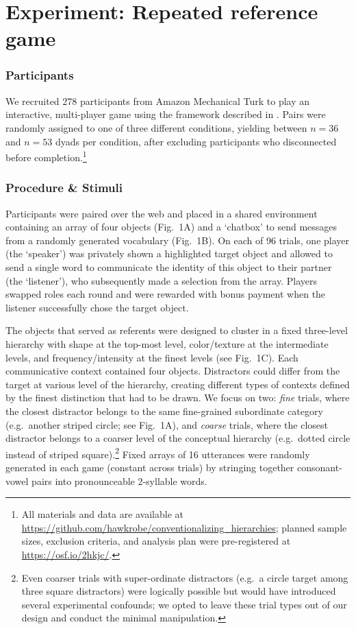 \documentclass[10pt,letterpaper]{article}
\begin{document}
\section{Experiment: Repeated reference game}

\subsubsection{Participants}

We recruited 278 participants from Amazon Mechanical Turk to play an interactive, multi-player game using the framework described in . Pairs were randomly assigned to one of three different conditions, yielding between $n=36$ and $n=53$ dyads per condition, after excluding participants who disconnected before completion.\footnote{All materials and data are available at \url{https://github.com/hawkrobe/conventionalizing_hierarchies}; planned sample sizes, exclusion criteria, and analysis plan were pre-registered at \url{https://osf.io/2hkjc/}.}

\subsubsection{Procedure \& Stimuli}
Participants were paired over the web and placed in a shared environment containing an array of four objects (Fig.\ 1A) and a `chatbox' to send messages from a randomly generated vocabulary (Fig.\ 1B). On each of 96 trials, one player (the `speaker') was privately shown a highlighted target object and allowed to send a single word to communicate the identity of this object to their partner (the `listener'), who subsequently made a selection from the array. Players swapped roles each round and were rewarded with bonus payment when the listener successfully chose the target object.

The objects that served as referents were designed to cluster in a fixed three-level hierarchy with shape at the top-most level, color/texture at the intermediate levels, and frequency/intensity at the finest levels (see Fig.\ 1C). Each communicative context contained four objects. Distractors could differ from the target at various level of the hierarchy, creating different types of contexts defined by the finest distinction that had to be drawn. We focus on two: \emph{fine} trials, where the closest distractor belongs to the same fine-grained subordinate category (e.g.\ another striped circle; see Fig.\ 1A), and \emph{coarse} trials, where the closest distractor belongs to a coarser level of the conceptual hierarchy (e.g.\ dotted circle instead of striped square).\footnote{Even coarser trials with super-ordinate distractors (e.g.\ a circle target among three square distractors) were logically possible but would have introduced several experimental confounds; we opted to leave these trial types out of our design and conduct the minimal manipulation.} Fixed arrays of 16 utterances were randomly generated in each game (constant across trials) by stringing together consonant-vowel pairs into pronounceable 2-syllable words.
\end{document}

